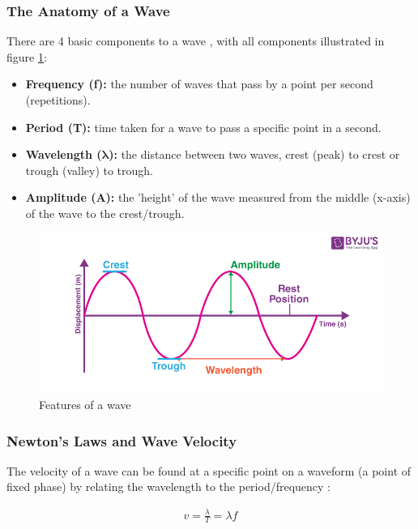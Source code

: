 \documentclass[12pt]{article}
\begin{document}
\subsubsection{The Anatomy of a Wave}

There are 4 basic components to a wave \cite{wavebyju,waveffden}, with all components illustrated in figure \ref{fig:waveprop}:

\begin{itemize}
    \item \textbf{Frequency (f):} the number of waves that pass by a point per second (repetitions).
    \item \textbf{Period (T):} time taken for a wave to pass a specific point in a second.
    \item \textbf{Wavelength ($\mathbf{\lambda}$):} the distance between two waves, crest (peak) to crest or trough (valley) to trough.
    \item \textbf{Amplitude (A):} the 'height' of the wave measured from the middle (x-axis) of the wave to the crest/trough.
\end{itemize}

\begin{figure}[H]
    \centering
    \includegraphics[width=14cm]{wave.png}
    \caption{\centering Features of a wave \protect\cite{wavebyju}}
    \label{fig:waveprop}
\end{figure}


\subsubsection{Newton's Laws and Wave Velocity}

The velocity of a wave can be found at a specific point on a waveform (a point of fixed phase) by relating the wavelength to the period/frequency \cite{geekwave,librewave}:

\vspace{-1.5ex}
\begin{gather} \label{eq:1}
    v = \frac{\lambda}{T} = \lambda f
\end{gather}
\end{document}
